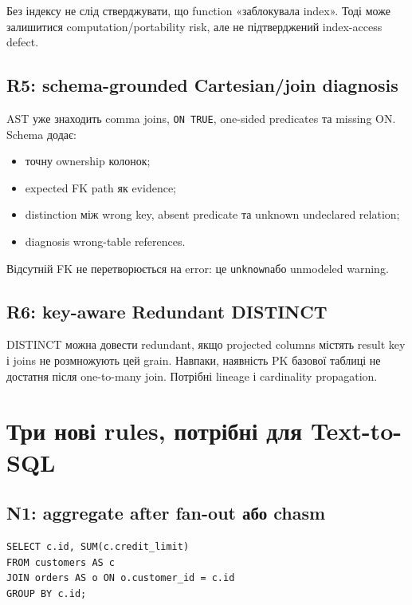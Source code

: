 \documentclass[11pt,a4paper]{article}
\newcommand{\unknown}{\texttt{unknown}}
\begin{document}
Без індексу не слід стверджувати, що function «заблокувала index». Тоді може
залишитися computation/portability risk, але не підтверджений index-access defect.

\subsection{R5: schema-grounded Cartesian/join diagnosis}

AST уже знаходить comma joins, \texttt{ON TRUE}, one-sided predicates та missing
ON. Schema додає:

\begin{itemize}
\item точну ownership колонок;
\item expected FK path як evidence;
\item distinction між wrong key, absent predicate та unknown undeclared relation;
\item diagnosis wrong-table references.
\end{itemize}

Відсутній FK не перетворюється на error: це \unknown або unmodeled warning.

\subsection{R6: key-aware Redundant DISTINCT}

DISTINCT можна довести redundant, якщо projected columns містять result key і joins
не розмножують цей grain. Навпаки, наявність PK базової таблиці не достатня після
one-to-many join. Потрібні lineage і cardinality propagation.

\section{Три нові rules, потрібні для Text-to-SQL}

\subsection{N1: aggregate after fan-out або chasm}

\begin{lstlisting}[style=sqlstyle]
SELECT c.id, SUM(c.credit_limit)
FROM customers AS c
JOIN orders AS o ON o.customer_id = c.id
GROUP BY c.id;
\end{lstlisting}
\end{document}
